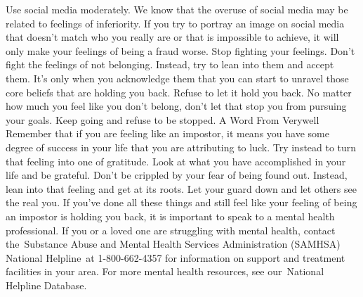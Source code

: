 \documentclass[14pt,a4paper]{extarticle}
\begin{document}
Use social media moderately. We know that the overuse of social media may be related to feelings of inferiority. If you try to portray an image on social media that doesn't match who you really are or that is impossible to achieve, it will only make your feelings of being a fraud worse.
Stop fighting your feelings. Don't fight the feelings of not belonging. Instead, try to lean into them and accept them. It's only when you acknowledge them that you can start to unravel those core beliefs that are holding you back.
Refuse to let it hold you back. No matter how much you feel like you don't belong, don't let that stop you from pursuing your goals. Keep going and refuse to be stopped.
\newline\newline  A Word From Verywell \newline\newline 
Remember that if you are feeling like an impostor, it means you have some degree of success in your life that you are attributing to luck. Try instead to turn that feeling into one of gratitude. Look at what you have accomplished in your life and be grateful.
\newline\newline 
Don't be crippled by your fear of being found out. Instead, lean into that feeling and get at its roots. Let your guard down and let others see the real you. If you've done all these things and still feel like your feeling of being an impostor is holding you back, it is important to speak to a mental health professional.
\newline\newline 
If you or a loved one are struggling with mental health, contact the Substance Abuse and Mental Health Services Administration (SAMHSA) National Helpline at 1-800-662-4357 for information on support and treatment facilities in your area.
For more mental health resources, see our National Helpline Database.\newline\newline \newline\newline 
\end{document}
